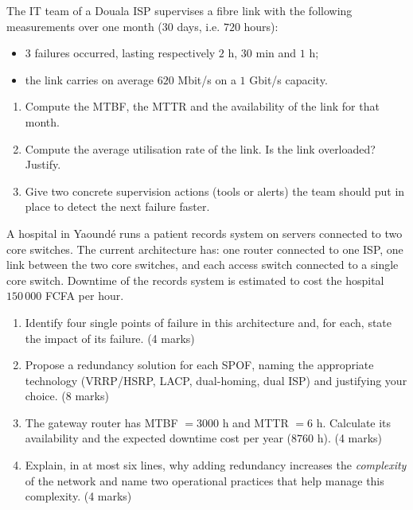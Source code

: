 \documentclass[11pt]{article}
\newcounter{popsec}
\newcounter{popsub}
\newcommand{\courssub}[1]{%
  \stepcounter{popsub}%
  \par\vspace{9pt}\noindent{\popxbold\fontsize{11.5}{13}\selectfont\color{popink}{\color{poporange}\thepopsec.\thepopsub}\hspace{6pt}#1}\par\nopagebreak\vspace{4pt}
}
\begin{document}
\begin{exercice}
The IT team of a Douala ISP supervises a fibre link with the following measurements over one month ($30$ days, i.e. $720$ hours):
\begin{itemize}
\item $3$ failures occurred, lasting respectively $2$ h, $30$ min and $1$ h;
\item the link carries on average $620$ Mbit/s on a $1$ Gbit/s capacity.
\end{itemize}
\begin{enumerate}
\item Compute the MTBF, the MTTR and the availability of the link for that month.
\item Compute the average utilisation rate of the link. Is the link overloaded? Justify.
\item Give two concrete supervision actions (tools or alerts) the team should put in place to detect the next failure faster.
\end{enumerate}
\end{exercice}

\courssub{I prepare for the GCE}

\begin{exercice}
A hospital in Yaoundé runs a patient records system on servers connected to two core switches. The current architecture has: one router connected to one ISP, one link between the two core switches, and each access switch connected to a single core switch. Downtime of the records system is estimated to cost the hospital $150\,000$ FCFA per hour.
\begin{enumerate}
\item Identify four single points of failure in this architecture and, for each, state the impact of its failure. \hfill (4 marks)
\item Propose a redundancy solution for each SPOF, naming the appropriate technology (VRRP/HSRP, LACP, dual-homing, dual ISP) and justifying your choice. \hfill (8 marks)
\item The gateway router has MTBF $= 3000$ h and MTTR $= 6$ h. Calculate its availability and the expected downtime cost per year ($8760$ h). \hfill (4 marks)
\item Explain, in at most six lines, why adding redundancy increases the \emph{complexity} of the network and name two operational practices that help manage this complexity. \hfill (4 marks)
\end{enumerate}
\end{exercice}
\end{document}
